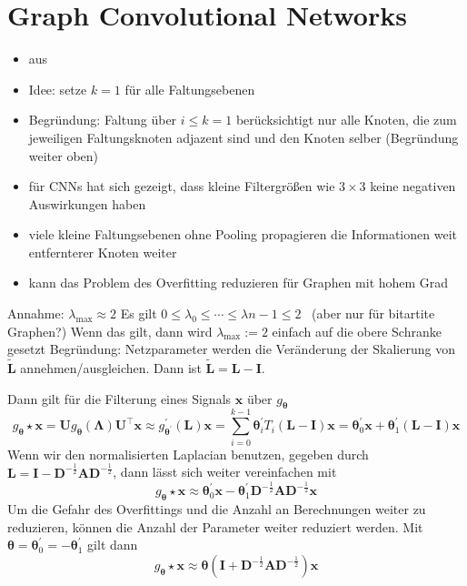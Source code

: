 \section{Graph Convolutional Networks}

\begin{itemize}
  \item aus~\cite{GCN}
  \item Idee: setze $k = 1$ für alle Faltungsebenen
  \item Begründung: Faltung über $i \leq k = 1$ berücksichtigt nur alle Knoten, die zum jeweiligen Faltungsknoten adjazent sind und den Knoten selber (Begründung weiter oben)
  \item für CNNs hat sich gezeigt, dass kleine Filtergrößen wie $3 \times 3$ keine negativen Auswirkungen haben
  \item viele kleine Faltungsebenen ohne Pooling propagieren die Informationen weit entfernterer Knoten weiter 
  \item kann das Problem des Overfitting reduzieren für Graphen mit hohem Grad
\end{itemize}

Annahme: $\lambda_{\max} \approx 2$ 
Es gilt $0 \leq \lambda_0 \leq \cdots \leq \lambda{n-1} \leq 2$~\cite{Chung} (aber nur für bitartite Graphen?)
Wenn das gilt, dann wird $\lambda_{\max} := 2$ einfach auf die obere Schranke gesetzt
Begründung: Netzparameter werden die Veränderung der Skalierung von $\mathbf{\tilde L}$ annehmen/ausgleichen.
Dann ist $\mathbf{\tilde L} = \mathbf{L} - \mathbf{I}$.

Dann gilt für die Filterung eines Signals $\mathbf{x}$ über $g_{\mathbf{\theta}}$
\begin{equation}
  g_{\mathbf{\theta}} \star \mathbf{x} = \mathbf{U}g_{\mathbf{\theta}}\left(\mathbf{\Lambda}\right)\mathbf{U}^{\top}\mathbf{x} \approx g^{\prime}_{\mathbf{\theta^{\prime}}} \left(\mathbf{L}\right) \mathbf{x} = \sum_{i=0}^{k-1} \mathbf{\theta}^{\prime}_i T_i \left(\mathbf{L} - \mathbf{I}\right) \mathbf{x} = \mathbf{\theta}^{\prime}_0 \mathbf{x} + \mathbf{\theta}^{\prime}_1 \left(\mathbf{L} - \mathbf{I}\right) \mathbf{x}
\end{equation}
Wenn wir den normalisierten Laplacian benutzen, gegeben durch $\mathbf{L} = \mathbf{I} - \mathbf{D}^{-\frac{1}{2}} \mathbf{A} \mathbf{D}^{-\frac{1}{2}}$, dann lässt sich weiter vereinfachen mit
\begin{equation}
  g_{\mathbf{\theta}} \star \mathbf{x} \approx \mathbf{\theta}^{\prime}_0 \mathbf{x} - \mathbf{\theta}^{\prime}_1 \mathbf{D}^{-\frac{1}{2}} \mathbf{A} \mathbf{D}^{-\frac{1}{2}} \mathbf{x}
\end{equation}
Um die Gefahr des Overfittings und die Anzahl an Berechnungen weiter zu reduzieren, können die Anzahl der Parameter weiter reduziert werden.
Mit $\mathbf{\theta} = \mathbf{\theta}^{\prime}_0 = - \mathbf{\theta}^{\prime}_1$ gilt dann
\begin{equation}
  g_{\mathbf{\theta}} \star \mathbf{x} \approx \mathbf{\theta} \left(\mathbf{I} + \mathbf{D}^{-\frac{1}{2}} \mathbf{A} \mathbf{D}^{-\frac{1}{2}}\right) \mathbf{x}
\end{equation}

